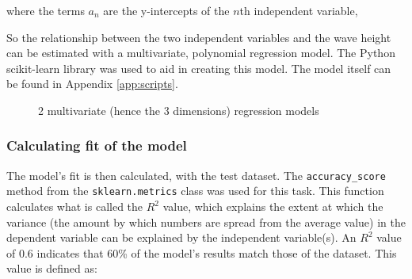 \documentclass[11pt,letterpaper]{article}
\begin{document}
where the terms $a_n$ are the y-intercepts of the $n$th independent variable,

So the relationship between the two independent variables and the wave height can be estimated with a multivariate, polynomial regression model. The Python scikit-learn library was used to aid in creating this model. The model itself can be found in Appendix \ref{app:scripts}.





\begin{figure}[H]
    \centering
    \qquad
    \caption{2 multivariate (hence the 3 dimensions) regression models}
    \label{fig:example}
\end{figure}


\subsubsection{Calculating fit of the model}

The model's fit is then calculated, with the test dataset. The \verb|accuracy_score| method from the \verb|sklearn.metrics| class was used for this task. This function calculates what is called the $R^2$ value, which explains the extent at which the variance (the amount by which numbers are spread from the average value) in the dependent variable can be explained by the independent variable(s). An $R^2$ value of 0.6 indicates that 60\% of the model's results match those of the dataset. This value is defined as:
\end{document}
